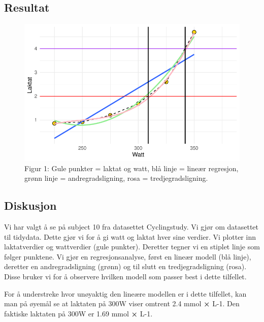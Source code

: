 \documentclass[
  letterpaper,
  DIV=11,
  numbers=noendperiod]{scrreprt}
\begin{document}
\subsection{Resultat}\label{resultat-1}

\begin{figure}[H]

{\centering \includegraphics{02-regression-models_files/figure-pdf/unnamed-chunk-1-1.pdf}

}

\caption{Figur 1: Gule punkter = laktat og watt, blå linje = lineær
regresjon, grønn linje = andregradsligning, rosa = tredjegradsligning.}

\end{figure}%

\subsection{Diskusjon}\label{diskusjon-1}

Vi har valgt å se på subject 10 fra datasettet Cyclingstudy. Vi gjør om
datasettet til tidydata. Dette gjør vi for å gi watt og laktat hver sine
verdier. Vi plotter inn laktatverdier og wattverdier (gule punkter).
Deretter tegner vi en stiplet linje som følger punktene. Vi gjør en
regresjonsanalyse, først en lineær modell (blå linje), deretter en
andregradsligning (grønn) og til slutt en tredjegradsligning (rosa).
Disse bruker vi for å observere hvilken modell som passer best i dette
tilfellet.

For å understreke hvor unøyaktig den lineære modellen er i dette
tilfellet, kan man på øyemål se at laktaten på 300W viser omtrent 2.4
mmol \textbf{×} L-1. Den faktiske laktaten på 300W er 1.69 mmol
\textbf{×} L-1.
\end{document}
